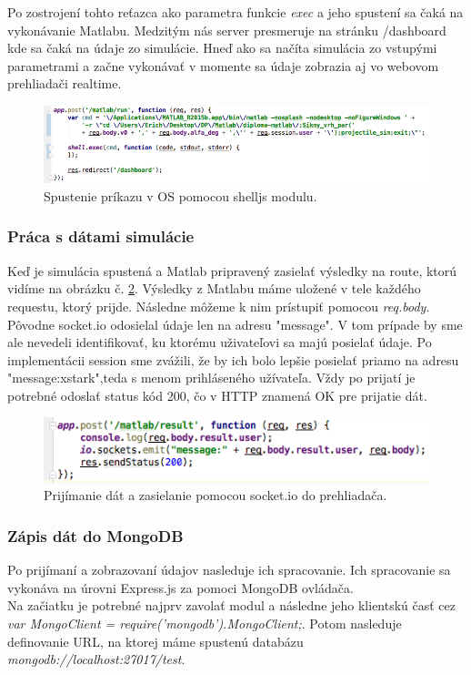 Po zostrojení tohto reťazca ako parametra funkcie \textit{exec} a jeho spustení sa čaká na vykonávanie Matlabu. Medzitým nás server presmeruje na stránku /dashboard kde sa čaká na údaje zo simulácie. Hneď ako sa načíta simulácia zo vstupými parametrami a začne vykonávať v momente sa údaje zobrazia aj vo webovom prehliadači realtime.

\begin{figure}[H]
  \centering
  \includegraphics[scale=0.6]{img/code/express-shelljs.png}
  \caption{Spustenie príkazu v OS pomocou shelljs modulu.}
  \label{img-express-shelljs}
\end{figure}

\subsubsection{Práca s dátami simulácie}
Keď je simulácia spustená a Matlab pripravený zasielať výsledky na route, ktorú vidíme na obrázku č. \ref{img-express-socketio}. Výsledky z Matlabu máme uložené v tele každého requestu, ktorý prijde. Následne môžeme k nim prístupiť pomocou \textit{req.body}. Pôvodne socket.io odosielal údaje len na adresu "message". V tom prípade by sme ale nevedeli identifikovať, ku ktorému uživateľovi sa majú posielať údaje. Po implementácii session sme zvážili, že by ich bolo lepšie posielať priamo na adresu "message:xstark",teda s menom prihláseného užívateľa. Vždy po prijatí je potrebné odoslať status kód 200, čo v HTTP znamená OK pre prijatie dát.

\begin{figure}[H]
  \centering
  \includegraphics[scale=0.7]{img/code/express-socketio.png}
  \caption{Prijímanie dát a zasielanie pomocou socket.io do prehliadača.}
  \label{img-express-socketio}
\end{figure}

\subsubsection{Zápis dát do MongoDB}
Po prijímaní a zobrazovaní údajov nasleduje ich spracovanie. Ich spracovanie sa vykonáva na úrovni Express.js za pomoci MongoDB ovládača.\\
Na začiatku je potrebné najprv zavolať modul a následne jeho klientskú časť cez \textit{var MongoClient = require('mongodb').MongoClient;}. Potom nasleduje definovanie URL, na ktorej máme spustenú databázu \textit{mongodb://localhost:27017/test}.

